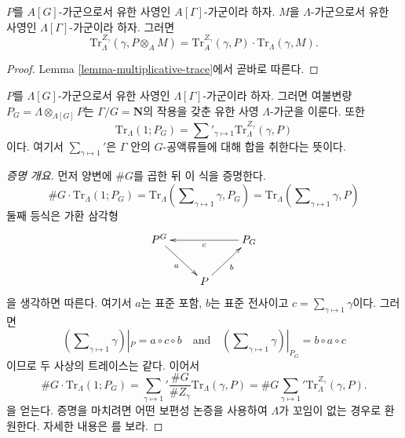 \begin{lemma}
\label{lemma-weak-trace}
$P$를 $A[G]$-가군으로서 유한 사영인 $A[\Gamma]$-가군이라 하자.
$M$을 $\Lambda$-가군으로서 유한 사영인
$\Lambda[\Gamma]$-가군이라 하자. 그러면
$$
\text{Tr}_{\Lambda}^{Z_\gamma}(\gamma, P \otimes_A M) =
\text{Tr}_A^{Z_\gamma}(\gamma, P)\cdot \text{Tr}_\Lambda(\gamma, M).
$$
\end{lemma}

\begin{proof}
Lemma \ref{lemma-multiplicative-trace}에서 곧바로 따른다.
\end{proof}

\begin{lemma}
\label{lemma-trivial-trace}
$P$를 $\Lambda[G]$-가군으로서 유한 사영인
$\Lambda[\Gamma]$-가군이라 하자. 그러면 여불변량
$P_G = \Lambda \otimes_{\Lambda[G]} P$는
$\Gamma/G = \mathbf{N}$의 작용을 갖춘 유한 사영 $\Lambda$-가군을
이룬다. 또한
$$
\text{Tr}_\Lambda(1; P_G) =
\sum\nolimits'_{\gamma \mapsto 1} \text{Tr}_\Lambda^{Z_\gamma}(\gamma, P)
$$
이다. 여기서 $\sum_{\gamma\mapsto 1}'$은 $\Gamma$ 안의
$G$-공액류들에 대해 합을 취한다는 뜻이다.
\end{lemma}

\begin{proof}[증명 개요]
먼저 양변에 $\# G$를 곱한 뒤 이 식을 증명한다.
$$
\# G\cdot \text{Tr}_\Lambda(1; P_G)
= \text{Tr}_\Lambda(\sum\nolimits_{\gamma\mapsto 1} \gamma, P_G)
= \text{Tr}_\Lambda(\sum\nolimits_{\gamma\mapsto 1} \gamma, P)
$$
둘째 등식은 가환 삼각형
$$
\xymatrix{
P^G \ar[rd]_a & & P_G \ar[ll]^c \\
& P \ar[ur]_b
}
$$
을 생각하면 따른다. 여기서 $a$는 표준 포함, $b$는 표준 전사이고
$c = \sum_{\gamma \mapsto 1} \gamma$이다. 그러면
$$
(\sum\nolimits_{\gamma \mapsto 1} \gamma) |_P = a \circ c \circ b
\quad\text{and}\quad
(\sum\nolimits_{\gamma \mapsto 1} \gamma) |_{P_G} = b \circ a \circ c
$$
이므로 두 사상의 트레이스는 같다. 이어서
$$
\# G\cdot \text{Tr}_\Lambda(1; P_G)
=
{\sum_{\gamma\mapsto 1}}'
\frac{\# G}{\# Z_\gamma}\text{Tr}_\Lambda(\gamma, P)
= \# G{\sum_{\gamma\mapsto 1}}' \text{Tr}_\Lambda^{Z_\gamma}(\gamma, P).
$$
을 얻는다. 증명을 마치려면 어떤 보편성 논증을 사용하여
$\Lambda$가 꼬임이 없는 경우로 환원한다. 자세한 내용은
\cite{SGA4.5}를 보라.
\end{proof}

